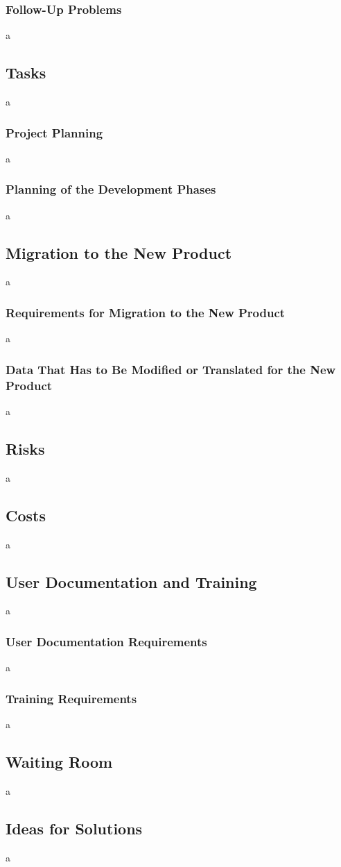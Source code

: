 \documentclass[12pt]{article}
\begin{document}
\subsubsection{Follow-Up Problems}
a

\subsection{Tasks}
a

\subsubsection{Project Planning}
a

\subsubsection{Planning of the Development Phases}
a

\subsection{Migration to the New Product}
a

\subsubsection{Requirements for Migration to the New Product}
a

\subsubsection{Data That Has to Be Modified or Translated for the New Product}
a

\subsection{Risks}
a

\subsection{Costs}
a

\subsection{User Documentation and Training}
a

\subsubsection{User Documentation Requirements}
a

\subsubsection{Training Requirements}
a

\subsection{Waiting Room}
a

\subsection{Ideas for Solutions}
a
\end{document}
